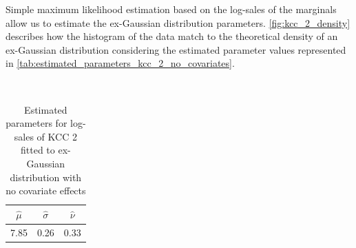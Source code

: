 
Simple maximum likelihood estimation based on the log-sales of the marginals allow us to estimate the ex-Gaussian distribution parameters. \autoref{fig:kcc_2_density} describes how the histogram of the data match to the theoretical density of an ex-Gaussian distribution considering the estimated parameter values represented in \autoref{tab:estimated_parameters_kcc_2_no_covariates}.
\\




\begin{table}[H]
\setlength\arrayrulewidth{1pt}  
\centering
\begin{adjustbox}{max width=\textwidth}\
\begin{tabular}{|c|c|c|}
\hline
\rowcolor{lightgray} 
$\hat{\mu}$ & $\hat{\sigma}$ & $\hat{\nu}$ \\ \hline
7.85        & 0.26           & 0.33        \\ \hline
\end{tabular}
\end{adjustbox}
\caption{Estimated parameters for log-sales of KCC 2 fitted to ex-Gaussian distribution with no covariate effects}
\label{tab:estimated_parameters_kcc_2_no_covariates}
\end{table}





